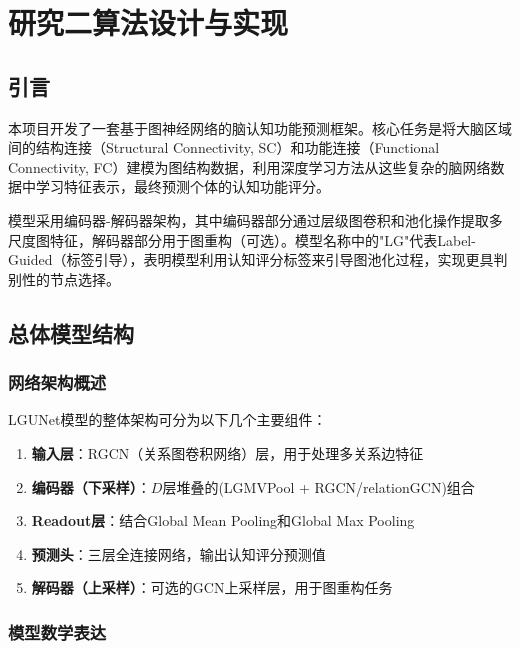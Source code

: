 
\chapter{研究二算法设计与实现}

\section{引言}

本项目开发了一套基于图神经网络的脑认知功能预测框架。核心任务是将大脑区域间的结构连接（Structural Connectivity, SC）和功能连接（Functional Connectivity, FC）建模为图结构数据，利用深度学习方法从这些复杂的脑网络数据中学习特征表示，最终预测个体的认知功能评分。

模型采用编码器-解码器架构，其中编码器部分通过层级图卷积和池化操作提取多尺度图特征，解码器部分用于图重构（可选）。模型名称中的"LG"代表Label-Guided（标签引导），表明模型利用认知评分标签来引导图池化过程，实现更具判别性的节点选择。

\newpage

\section{总体模型结构}

\subsection{网络架构概述}

LGUNet模型的整体架构可分为以下几个主要组件：

\begin{enumerate}
    \item \textbf{输入层}：RGCN（关系图卷积网络）层，用于处理多关系边特征
    \item \textbf{编码器（下采样）}：$D$层堆叠的(LGMVPool + RGCN/relationGCN)组合
    \item \textbf{Readout层}：结合Global Mean Pooling和Global Max Pooling
    \item \textbf{预测头}：三层全连接网络，输出认知评分预测值
    \item \textbf{解码器（上采样）}：可选的GCN上采样层，用于图重构任务
\end{enumerate}

\subsection{模型数学表达}

